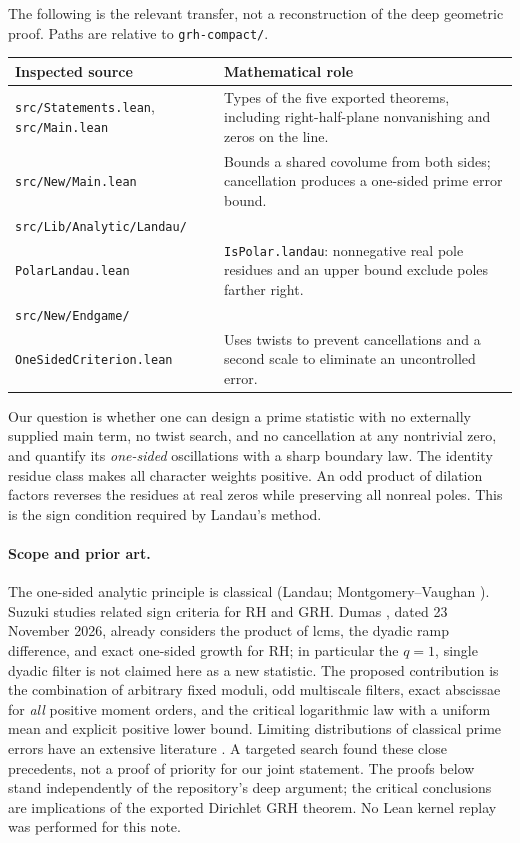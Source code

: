 \documentclass[11pt]{article}
\begin{document}
The following is the relevant transfer, not a reconstruction of the deep geometric proof. Paths are relative to \texttt{grh-compact/}.
\begin{center}\small
\begin{tabular}{p{.43\linewidth}p{.48\linewidth}}
\toprule
Inspected source & Mathematical role\\\midrule
\texttt{src/Statements.lean}, \texttt{src/Main.lean} & Types of the five exported theorems, including right-half-plane nonvanishing and zeros on the line.\\
\texttt{src/New/Main.lean} & Bounds a shared covolume from both sides; cancellation produces a one-sided prime error bound.\\
\texttt{src/Lib/Analytic/Landau/}\\\texttt{PolarLandau.lean} & \texttt{IsPolar.landau}: nonnegative real pole residues and an upper bound exclude poles farther right.\\
\texttt{src/New/Endgame/}\\\texttt{OneSidedCriterion.lean} & Uses twists to prevent cancellations and a second scale to eliminate an uncontrolled error.\\\bottomrule
\end{tabular}
\end{center}
Our question is whether one can design a prime statistic with no externally supplied main term, no twist search, and no cancellation at any nontrivial zero, and quantify its \emph{one-sided} oscillations with a sharp boundary law. The identity residue class makes all character weights positive. An odd product of dilation factors reverses the residues at real zeros while preserving all nonreal poles. This is the sign condition required by Landau's method.

\paragraph{Scope and prior art.} The one-sided analytic principle is classical (Landau; Montgomery--Vaughan \cite{mv}). Suzuki \cite{suzuki} studies related sign criteria for RH and GRH. Dumas \cite{dumas}, dated 23 November 2026, already considers the product of lcms, the dyadic ramp difference, and exact one-sided growth for RH; in particular the $q=1$, single dyadic filter is not claimed here as a new statistic. The proposed contribution is the combination of arbitrary fixed moduli, odd multiscale filters, exact abscissae for \emph{all} positive moment orders, and the critical logarithmic law with a uniform mean and explicit positive lower bound. Limiting distributions of classical prime errors have an extensive literature \cite{akbary}. A targeted search found these close precedents, not a proof of priority for our joint statement. The proofs below stand independently of the repository's deep argument; the critical conclusions are implications of the exported Dirichlet GRH theorem. No Lean kernel replay was performed for this note.
\end{document}
